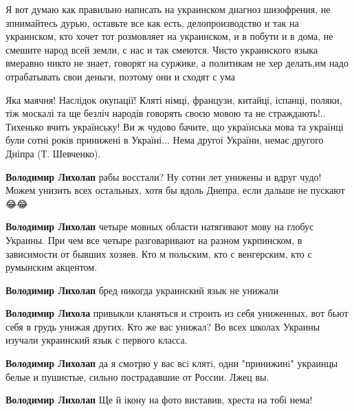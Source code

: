 \begin{itemize}

Я вот думаю как правильно написать на украинском диагноз шизофрения, не
зпнимайтесь дурью, оставьте все как есть, делопроизводство и так на украинском,
кто хочет тот розмовляет на украинском, и в побути и в дома, не смешите народ
всей земли, с нас и так смеются. Чисто украинского языка вмеравно никто не
знает, говорят на суржике, а политикам не хер делать,им надо отрабатывать свои
деньги, поэтому они и сходят с ума



Яка маячня! Наслідок окупації! Кляті німці, французи, китайці, іспанці, поляки,
тіж москалі та ще безліч народів говорять своєю мовою та не страждають!..
Тихенько вчить українську! Ви ж чудово бачите, що українська мова та українці
були сотні років принижені в Україні... Нема другої України, немає другого
Дніпра (Т. Шевченко).

\begin{itemize}
\textbf{Володимир Лихолап} рабы восстали? Ну сотни лет унижены и вдруг чудо! Можем унизить всех остальных, хотя бы вдоль Днепра, если дальше не пускают 😂😂

\textbf{Володимир Лихолап} четыре мовных области натягивают мову на глобус Украины. При чем все четыре разговаривают на разном укрпинском, в зависимости от бывших хозяев. Кто м польским, кто с венгерским, кто с румынским акцентом.

\textbf{Володимир Лихолап} бред никогда украинский язык не унижали

\textbf{Володимир Лихола} привыкли кланяться и строить из себя униженных, вот бьют себя в грудь унижая других. Кто же вас унижал? Во всех школах Украины изучали украинский язык с первого класса.

\textbf{Володимир Лихолап} да я смотрю у вас всi клятi, одни "принижинi" украинцы белые и пушистые, сильно пострадавшие от России.
Лжец вы.

\textbf{Володимир Лихолап} Ще й ікону на фото виставив, хреста на тобі нема!


\end{itemize}
\end{itemize}
